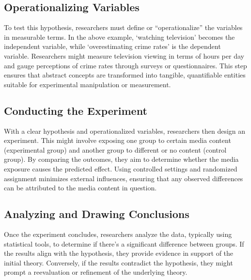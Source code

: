 \documentclass[
  b5paper]{book}
\begin{document}
\hypertarget{operationalizing-variables}{%
\subsection*{Operationalizing Variables}\label{operationalizing-variables}}

To test this hypothesis, researchers must define or ``operationalize'' the variables in measurable terms. In the above example, `watching television' becomes the independent variable, while `overestimating crime rates' is the dependent variable. Researchers might measure television viewing in terms of hours per day and gauge perceptions of crime rates through surveys or questionnaires. This step ensures that abstract concepts are transformed into tangible, quantifiable entities suitable for experimental manipulation or measurement.

\hypertarget{conducting-the-experiment}{%
\subsection*{Conducting the Experiment}\label{conducting-the-experiment}}

With a clear hypothesis and operationalized variables, researchers then design an experiment. This might involve exposing one group to certain media content (experimental group) and another group to different or no content (control group). By comparing the outcomes, they aim to determine whether the media exposure causes the predicted effect. Using controlled settings and randomized assignment minimizes external influences, ensuring that any observed differences can be attributed to the media content in question.

\hypertarget{analyzing-and-drawing-conclusions}{%
\subsection*{Analyzing and Drawing Conclusions}\label{analyzing-and-drawing-conclusions}}

Once the experiment concludes, researchers analyze the data, typically using statistical tools, to determine if there's a significant difference between groups. If the results align with the hypothesis, they provide evidence in support of the initial theory. Conversely, if the results contradict the hypothesis, they might prompt a reevaluation or refinement of the underlying theory.
\end{document}
